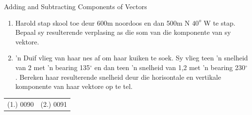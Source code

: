 \begin{exercises}{Adding and Subtracting Components of Vectors}
\noindent\vspace{-1cm}
\begin{enumerate}[noitemsep, label=\textbf{\arabic*}.]
\item Harold stap skool toe deur 600m noordoos en dan 500m N $40^o$ W te stap. Bepaal sy resulterende verplasing as die som van die komponente van sy vektore.
\item  'n Duif vlieg van haar nes af om haar kuiken te soek. Sy vlieg teen  'n snelheid van 2 \ms met  'n bearing 135${^\circ}$ en dan teen  'n snelheid van 1,2 \ms met 'n bearing 230${^\circ}$. Bereken haar resulterende snelheid deur die horisontale en vertikale komponente van haar vektore op te tel.
\end{enumerate}

\par \practiceinfo
 \par \begin{tabular}[h]{cc}
 (1.) 0090  &  (2.) 0091   & \end{tabular}
\end{exercises}

